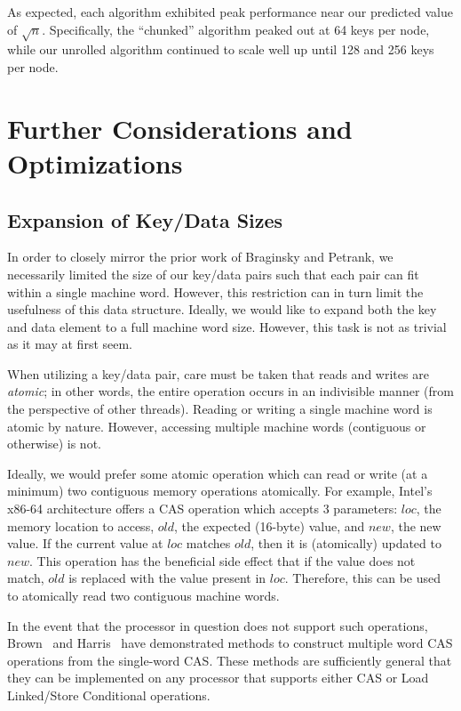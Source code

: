 \documentclass{llncs}
\begin{document}
{As expected, each algorithm exhibited peak performance near our predicted value of $\sqrt{n}$.  Specifically, the ``chunked'' algorithm peaked out at 64 keys per node, while our unrolled algorithm continued to scale well up until 128 and 256 keys per node.  

\section{Further Considerations and Optimizations}\label{Section:Optimizations}

\subsection{Expansion of Key/Data Sizes}
In order to closely mirror the prior work of Braginsky and Petrank, we necessarily limited the size of our key/data pairs such that each pair can fit within a single machine word.  However, this restriction can in turn limit the usefulness of this data structure.  Ideally, we would like to expand both the key and data element to a full machine word size.  However, this task is not as trivial as it may at first seem.

When utilizing a key/data pair, care must be taken that reads and writes are {\em atomic}; in other words, the entire operation occurs in an indivisible manner (from the perspective of other threads).  Reading or writing a single machine word is atomic by nature.  However, accessing multiple machine words (contiguous or otherwise) is not.

Ideally, we would prefer some atomic operation which can read or write (at a minimum) two contiguous memory operations atomically.  For example, Intel's x86-64 architecture offers a CAS operation which accepts 3 parameters: $loc$, the memory location to access, $old$, the expected (16-byte) value, and $new$, the new value.  If the current value at $loc$ matches $old$, then it is (atomically) updated to $new$.  This operation has the beneficial side effect that if the value does not match, $old$ is replaced with the value present in $loc$.  Therefore, this can be used to atomically read two contiguous machine words.  

In the event that the processor in question does not support such operations, Brown~\cite{BrownER13} and Harris~\cite{DBLP:conf/wdag/HarrisFP02} have demonstrated methods to construct multiple word CAS operations from the single-word CAS.  These methods are sufficiently general that they can be implemented on any processor that supports either CAS or Load Linked/Store Conditional operations.

}
\end{document}
